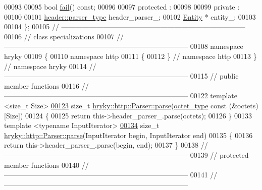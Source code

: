\begin{DoxyCode}
00093 
00095     \textcolor{keywordtype}{bool} \hyperlink{classhryky_1_1http_1_1_parser_a549242d05cb51d4b88354ab9892f56ec}{fail}() \textcolor{keyword}{const};
00096 
00097 \textcolor{keyword}{protected} :
00098 
00099 \textcolor{keyword}{private} :
00100 
00101     \hyperlink{classhryky_1_1http_1_1header_1_1_parser}{header::parser_type} header\_parser\_;
00102     \hyperlink{classhryky_1_1http_1_1_entity}{Entity} * entity\_;
00103 
00104 \};
00105 \textcolor{comment}{//
      ------------------------------------------------------------------------------}
00106 \textcolor{comment}{// class specializations}
00107 \textcolor{comment}{//
      ------------------------------------------------------------------------------}
00108 \textcolor{keyword}{namespace }hryky
00109 \{
00110 \textcolor{keyword}{namespace }http
00111 \{
00112 \} \textcolor{comment}{// namespace http}
00113 \} \textcolor{comment}{// namespace hryky}
00114 \textcolor{comment}{//
      ------------------------------------------------------------------------------}
00115 \textcolor{comment}{// public member functions}
00116 \textcolor{comment}{//
      ------------------------------------------------------------------------------}
00122 \textcolor{comment}{}\textcolor{keyword}{template} <\textcolor{keywordtype}{size\_t} Size>
\hypertarget{http__parser_8h_source_l00123}{}\hyperlink{classhryky_1_1http_1_1_parser_a877c3f5a5cb667abfceb39d2bfea0fd2}{00123} \textcolor{keywordtype}{size\_t} \hyperlink{classhryky_1_1http_1_1_parser_a8d52531e2de574b6fd00c0a378a6b9f3}{hryky::http::Parser::parse}(\hyperlink{namespacehryky_a488cba8b666be33ccca70e819684e3c8}{octet_type} \textcolor{keyword}{const} (&octets)[Size])
00124 \{
00125     \textcolor{keywordflow}{return} this->header\_parser\_.parse(octets);
00126 \}
00133 \textcolor{keyword}{template} <\textcolor{keyword}{typename} InputIterator>
\hypertarget{http__parser_8h_source_l00134}{}\hyperlink{classhryky_1_1http_1_1_parser_a8d52531e2de574b6fd00c0a378a6b9f3}{00134} \textcolor{keywordtype}{size\_t} \hyperlink{classhryky_1_1http_1_1_parser_a8d52531e2de574b6fd00c0a378a6b9f3}{hryky::http::Parser::parse}(InputIterator begin, InputIterator end)
00135 \{
00136     \textcolor{keywordflow}{return} this->header\_parser\_.parse(begin, end);
00137 \}
00138 \textcolor{comment}{//
      ------------------------------------------------------------------------------}
00139 \textcolor{comment}{// protected member functions}
00140 \textcolor{comment}{//
      ------------------------------------------------------------------------------}
00141 \textcolor{comment}{//
      ------------------------------------------------------------------------------}

\end{DoxyCode}
